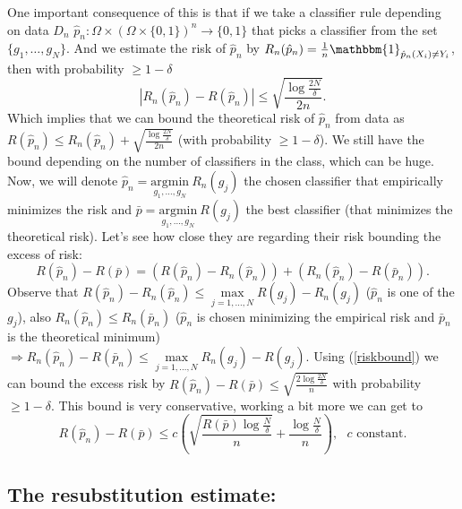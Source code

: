 \documentclass[11pt, english]{article}
\begin{document}
One important consequence of this is that if we take a classifier rule depending on data $D_n$ $\hat{p}_n:\Omega\times(\Omega\times\{0,1\})^n\rightarrow \{0,1\}$ that picks a classifier from the set $\{g_1,\dots,g_N\}$. And we estimate the risk of $\hat{p}_n$ by $R_n(\hat{p}_n)= \frac{1}{n}\mathbbm{1}_{\hat{p}_n(X_i)\neq Y_i}$, then with probability $\geq 1-\delta$
\begin{equation}
	|R_n(\hat{p}_n)-R(\hat{p}_n)|\leq \sqrt{\frac{\log\frac{2N}{\delta}}{2n}}.
	\label{riskbound}
\end{equation}
Which implies that we can bound the theoretical risk of $\hat{p}_n$ from data as $R(\hat{p}_n)\leq R_n(\hat{p}_n)+ \sqrt{\frac{\log\frac{2N}{\delta}}{2n}}$ (with probability $\geq 1-\delta$). We still have the bound depending on the number of classifiers in the class, which can be huge.\\

Now, we will denote $\hat{p}_n=\underset{g_1,\dots,g_N}{\text{argmin}}\ R_n(g_j)$ the chosen classifier that empirically minimizes the risk and $\bar{p}=\underset{g_1,\dots,g_N}{\text{argmin}}\ R(g_j)$ the best classifier (that minimizes the theoretical risk). Let's see how close they are regarding their risk bounding the excess of risk:
\begin{equation}
	R(\hat{p}_n)-R(\bar{p})=(R(\hat{p}_n)-R_n(\hat{p}_n))+(R_n(\hat{p}_n)-R(\bar{p}_n)).
\end{equation}
Observe that $R(\hat{p}_n)-R_n(\hat{p}_n)\leq\underset{j=1,\dots,N}{\max}R(g_j)-R_n(g_j)$ ($\hat{p}_n$ is one of the $g_j$), also $R_n(\hat{p}_n)\leq R_n(\bar{p}_n)$ ($\hat{p}_n$ is chosen minimizing the empirical risk and $\bar{p}_n$ is the theoretical minimum) $\Rightarrow R_n(\hat{p}_n)-R(\bar{p}_n)\leq \underset{j=1,\dots,N}{\max}R_n(g_j)-R(g_j)$. Using (\ref{riskbound}) we can bound the excess risk by $R(\hat{p}_n)-R(\bar{p})\leq \sqrt{\frac{2\log\frac{2N}{\delta}}{n}}$ with probability $\geq 1-\delta$. This bound is very conservative, working a bit more we can get to
\begin{equation}
	R(\hat{p}_n)-R(\bar{p})\leq c\left(\sqrt{\frac{R(\bar{p})\log\frac{N}{\delta}}{n}}+\frac{\log\frac{N}{\delta}}{n}\right), \text{ }c \text{ constant}.
\end{equation}
\subsection{The resubstitution estimate:}
\end{document}
